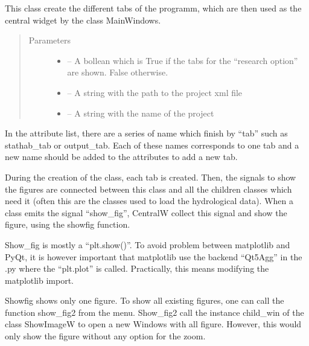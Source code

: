 \documentclass[letterpaper,10pt,english]{sphinxmanual}
\begin{document}
\begin{fulllineitems}
\label{\detokenize{index:src_GUI.Main_windows_1.CentralW}}
This class create the different tabs of the programm, which are then used as the central widget by the class
MainWindows.
\begin{quote}\begin{description}
\item[{Parameters}] \leavevmode\begin{itemize}
\item {} 
 -- A bollean which is True if the tabs for the ``research option'' are shown. False otherwise.

\item {} 
 -- A string with the path to the project xml file

\item {} 
 -- A string with the name of the project

\end{itemize}

\end{description}\end{quote}


In the attribute list, there are a series of name which finish by “tab” such as stathab\_tab or output\_tab. Each of
these names corresponds to one tab and a new name should be added to the attributes to add a new tab.

During the creation of the class, each tab is created. Then, the signals to show the figures are connected between this
class and all the children classes which need it (often this are the classes used to load the hydrological data). When a
class emits the signal “show\_fig”, CentralW collect this signal and show the figure, using the showfig function.

Show\_fig is mostly a “plt.show()”. To avoid problem between matplotlib and PyQt, it is however important that
matplotlib use the backend “Qt5Agg” in the .py where the “plt.plot” is called. Practically, this means modifying
the matplotlib import.

Showfig shows only one figure. To show all existing figures, one can call the function show\_fig2 from the menu.
Show\_fig2 call the instance child\_win of the class ShowImageW to open a new Windows with all figure. However,
this would only show the figure without any option for the zoom.


\end{fulllineitems}
\end{document}
